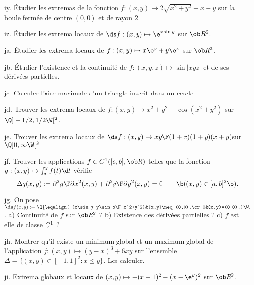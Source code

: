\exo [Level=2,Fight=1,Learn=1,Type=\Exercices,Field=\Extrema,Origin=] iy. 
Étudier les extremas de la fonction $f:(x,y)\mapsto2\sqrt{x^2+y^2}-x-y$ sur la boule fermée 
de centre $(0,0)$ et de rayon $2$. 

\exo [Level=2,Fight=1,Learn=1,Type=\Exercices,Field=\Extrema,Origin=] iz. 
Étudier les extrema locaux de $\ds f:(x,y)\mapsto\e^{x\sin y}$ sur $\ob R^2$.  

\exo [Level=2,Fight=2,Learn=1,Type=\Exercices,Field=\Extrema,Origin=] ja. 
Étudier les extrema locaux de $f:(x,y)\mapsto x\e^y+y\e^x$ sur $\ob R^2$. 

\exo [Level=2,Fight=3,Learn=1,Type=\Others,Field=\Extrema,Origin=] jb. 
Étudier l'existence et la continuité de $f:(x,y,z)\mapsto\sin|xyz|$ 
et de ses dérivées partielles. 

\exo [Level=2,Fight=2,Learn=2,Type=\Cours,Field=\Extrema,Origin=] jc. 
Calculer l'aire maximale d'un triangle inscrit dans un cercle. 

\exo [Level=2,Fight=1,Learn=1,Type=\Exercices,Field=\Extrema,Origin=] jd. 
Trouver les extrema locaux de $f:(x,y)\mapsto x^2+y^2+\cos(x^2+y^2)$ sur $\Q]-1/2,1/2\W[^2$. 

\exo [Level=2,Fight=1,Learn=1,Type=\Exercices,Field=\Extrema,Origin=] je. 
Trouver les extrema locaux de $\ds f:(x,y)\mapsto{xy\F(1+x)(1+y)(x+y)}$sur $\Q]0,\infty\W[^2$ 

\exo [Level=2,Fight=2,Learn=1,Field=\EquationsAuxDérivéesPartielles,Type=\Exercices,Origin=] jf. 
Trouver les applications $f\in\sc C^1([a,b],\ob R)$ telles 
que la fonction $g:(x,y)\mapsto \int_x^yf(t)\d t$ 
vérifie 
$$
\Delta g(x,y):={\partial^2 g\F\partial x^2}(x,y)+{\partial^2 g\F\partial y^2}(x,y)=0\qquad\b((x,y)\in[a,b]^2\b). 
$$

\exo [Level=2,Fight=2,Learn=2,Field=\FonctionsDePlusieursVariables,Type=\Exercices,Origin=] jg. 
On pose $\ds f(x,y):=\Q\{\eqalign{
{x\sin y-y\sin x\F x^2+y^2}&(x,y)\neq(0,0),\cr
0&(x,y)=(0,0).}
\W.$. \medskip\noindent
a) Continuité de $f$ sur $\ob R^2$ ? \pn 
b) Existence des dérivées partielles ? \pn 
c) $f$ est elle de classe $\sc C^1$ ?

\exo [Level=2,Fight=2,Learn=2,Type=\Exercices,Field=\Extrema,Origin=] jh. 
Montrer qu'il existe un minimum global et un maximum global de l'application $f:(x,y)\mapsto(y-x)^3+6xy$ sur l'ensemble $\Delta=\{(x,y)\in[-1,1]^2:x\le y\}$. 
Les calculer. 

\exo [Level=2,Fight=1,Learn=1,Type=\Exercices,Field=\Extrema,Origin=] ji. 
Extrema globaux et locaux de $(x,y)\mapsto -(x-1)^2-(x-\e^y)^2$ sur $\ob R^2$. 

